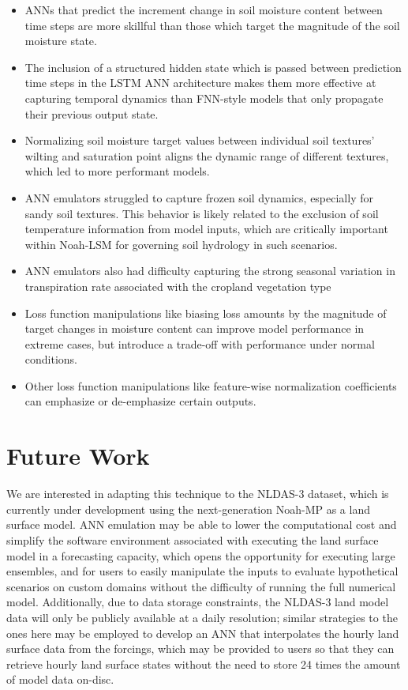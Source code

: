 \begin{itemize}
    \item{ANNs that predict the increment change in soil moisture content between time steps are more skillful than those which target the magnitude of the soil moisture state.}
    \item{The inclusion of a structured hidden state which is passed between prediction time steps in the LSTM ANN architecture makes them more effective at capturing temporal dynamics than FNN-style models that only propagate their previous output state.}
    \item{Normalizing soil moisture target values between individual soil textures' wilting and saturation point aligns the dynamic range of different textures, which led to more performant models.}
    \item{ANN emulators struggled to capture frozen soil dynamics, especially for sandy soil textures. This behavior is likely related to the exclusion of soil temperature information from model inputs, which are critically important within Noah-LSM for governing soil hydrology in such scenarios.}
    \item{ANN emulators also had difficulty capturing the strong seasonal variation in transpiration rate associated with the cropland vegetation type}
    \item{Loss function manipulations like biasing loss amounts by the magnitude of target changes in moisture content can improve model performance in extreme cases, but introduce a trade-off with performance under normal conditions.}
    \item{Other loss function manipulations like feature-wise normalization coefficients can emphasize or de-emphasize certain outputs.}
\end{itemize}

\section{Future Work}

We are interested in adapting this technique to the NLDAS-3 dataset, which is currently under development using the next-generation Noah-MP as a land surface model. ANN emulation may be able to lower the computational cost and simplify the software environment associated with executing the land surface model in a forecasting capacity, which opens the opportunity for executing large ensembles, and for users to easily manipulate the inputs to evaluate hypothetical scenarios on custom domains without the difficulty of running the full numerical model. Additionally, due to data storage constraints, the NLDAS-3 land model data will only be publicly available at a daily resolution; similar strategies to the ones here may be employed to develop an ANN that interpolates the hourly land surface data from the forcings, which may be provided to users so that they can retrieve hourly land surface states without the need to store 24 times the amount of model data on-disc.

